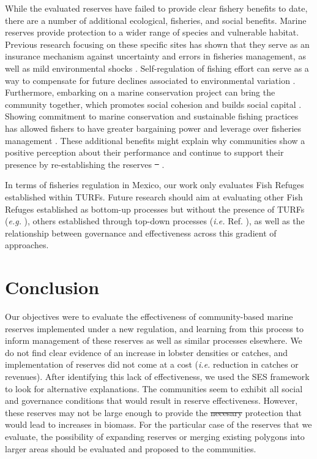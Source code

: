 \documentclass[10pt,letterpaper]{article}
\providecommand{\DIFaddtex}[1]{{\protect\color{blue}\uwave{#1}}} %
\providecommand{\DIFdeltex}[1]{{\protect\color{red}\sout{#1}}}                      %
\providecommand{\DIFaddbegin}{} %
\providecommand{\DIFaddend}{} %
\providecommand{\DIFdelbegin}{} %
\providecommand{\DIFdelend}{} %
\providecommand{\DIFadd}[1]{\texorpdfstring{\DIFaddtex{#1}}{#1}} %
\providecommand{\DIFdel}[1]{\texorpdfstring{\DIFdeltex{#1}}{}} %
\newcommand{\DIFscaledelfig}{0.5}
\newlength{\DIFdelgraphicswidth} %
\newlength{\DIFdelgraphicsheight} %
\newcommand{\DIFaddincludegraphics}[2][]{{\color{blue}\fbox{\DIFOincludegraphics[#1]{#2}}}} %
\newcommand{\DIFdelincludegraphics}[2][]{%
\sbox{\DIFdelgraphicsbox}{\DIFOincludegraphics[#1]{#2}}%
\settoboxwidth{\DIFdelgraphicswidth}{\DIFdelgraphicsbox} %
\settoboxtotalheight{\DIFdelgraphicsheight}{\DIFdelgraphicsbox} %
\scalebox{\DIFscaledelfig}{%
\parbox[b]{\DIFdelgraphicswidth}{\usebox{\DIFdelgraphicsbox}\\[-\baselineskip] \rule{\DIFdelgraphicswidth}{0em}}\llap{\resizebox{\DIFdelgraphicswidth}{\DIFdelgraphicsheight}{%
\setlength{\unitlength}{\DIFdelgraphicswidth}%
\begin{picture}(1,1)%
\thicklines\linethickness{2pt} %
{\color[rgb]{1,0,0}\put(0,0){\framebox(1,1){}}}%
{\color[rgb]{1,0,0}\put(0,0){\line( 1,1){1}}}%
{\color[rgb]{1,0,0}\put(0,1){\line(1,-1){1}}}%
\end{picture}%
}\hspace*{3pt}}} %
} %
\DeclareRobustCommand{\DIFaddbegin}{\DIFOaddbegin \let\includegraphics\DIFaddincludegraphics} %
\DeclareRobustCommand{\DIFaddend}{\DIFOaddend \let\includegraphics\DIFOincludegraphics} %
\DeclareRobustCommand{\DIFdelbegin}{\DIFOdelbegin \let\includegraphics\DIFdelincludegraphics} %
\DeclareRobustCommand{\DIFdelend}{\DIFOaddend \let\includegraphics\DIFOincludegraphics} %
\begin{document}
While the evaluated reserves have failed to provide clear fishery benefits to date, there are a number of additional ecological, fisheries, and social benefits. Marine reserves provide protection to a wider range of species and vulnerable habitat. Previous research focusing on these specific sites has shown that they serve as an insurance mechanism against uncertainty and errors in fisheries management, as well as mild environmental shocks \cite{micheli_2012-EU,deleo_2015,roberts_2017-J9,aalto}. Self-regulation of fishing effort can serve as a way to compensate for future declines associated to environmental variation \cite{finkbeiner_2018}. Furthermore, embarking on a marine conservation project can bring the community together, which promotes social cohesion and builds social capital \cite{fulton_2019}. Showing commitment to marine conservation and sustainable fishing practices has allowed fishers to have greater bargaining power and leverage over fisheries management \cite{prezramrez_2012}. These additional benefits might explain why communities show a positive perception about their performance and continue to support their presence by re-establishing the reserves \DIFdelbegin \DIFdel{\mbox{%
\cite{ayer_2018}}\hspace{0pt}%
}\DIFdelend \DIFaddbegin \DIFadd{\mbox{%
\cite{ayer_2018,bennett_2019}}\hspace{0pt}%
}\DIFaddend .

In terms of fisheries regulation in Mexico, our work only evaluates Fish Refuges established within TURFs. Future research should aim at evaluating other Fish Refuges established as bottom-up processes but without the presence of TURFs (\emph{e.g.} \cite{dof_websiteC_2012}), others established through top-down processes (\emph{i.e.} Ref. \cite{dof_websiteU_2018}), as well as the relationship between governance and effectiveness across this gradient of approaches. 

\section*{Conclusion}

Our objectives were to evaluate the effectiveness of community-based marine reserves implemented under a new regulation, and learning from this process to inform management of these reserves as well as similar processes elsewhere. We do not find clear evidence of an increase in lobster densities or catches, and implementation of reserves did not come at a cost (\emph{i.e.} reduction in catches or revenues). After identifying this lack of effectiveness, we used the SES framework to look for alternative explanations. The communities seem to exhibit all social and governance conditions that would result in reserve effectiveness. However, these reserves may not be large enough to provide the \DIFdelbegin \DIFdel{necesary }\DIFdelend \DIFaddbegin \DIFadd{necessary }\DIFaddend protection that would lead to increases in biomass. For the particular case of the reserves that we evaluate, the possibility of expanding reserves or merging existing polygons into larger areas should be evaluated and proposed to the communities.
\end{document}
